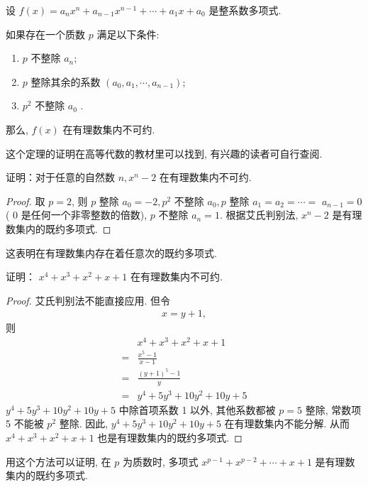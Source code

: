 \begin{theorem}[艾森斯坦判别法]
	设 $f(x)=a_{n} x^{n}+a_{n-1} x^{n-1}+\cdots+a_{1} x+a_{0}$ 是整系数多项式.

	如果存在一个质数 $p$ 满足以下条件:
	\begin{enumerate}
		\item $p$ 不整除 $a_{n}$;
		\item $p$ 整除其余的系数 $\left(a_{0}, a_{1}, \cdots, a_{n-1}\right)$;
		\item $p^{2}$ 不整除 $a_{0}$ .
	\end{enumerate}
	那么, $f(x)$ 在有理数集内不可约.
\end{theorem}

这个定理的证明在高等代数的教材里可以找到, 有兴趣的读者可自行查阅.

\begin{example}
	证明：对于任意的自然数 $n, x^{n}-2$ 在有理数集内不可约.
\end{example}
\begin{proof}
	取 $p=2$, 则 $p$ 整除 $a_{0}=-2, p^{2}$ 不整除 $a_{0}, p$ 整除 $a_{1}=a_{2}=\cdots=$ $a_{n-1}=0$ ( 0 是任何一个非零整数的倍数), $p$ 不整除 $a_{n}=1$. 根据艾氏判别法, $x^{n}-2$ 是有理数集内的既约多项式.
\end{proof}
\begin{note}
	这表明在有理数集内存在着任意次的既约多项式.
\end{note}

\begin{example}
	证明： $x^{4}+x^{3}+x^{2}+x+1$ 在有理数集内不可约.
\end{example}
\begin{proof}
	艾氏判别法不能直接应用. 但令
	\begin{align*}
		x=y+1,
	\end{align*}
	则
	\begin{align*}
		  & x^{4}+x^{3}+x^{2}+x+1         \\
		= & \frac{x^{5}-1}{x-1}           \\
		= & \frac{(y+1)^{5}-1}{y}         \\
		= & y^{4}+5 y^{3}+10 y^{2}+10 y+5
	\end{align*}
	$y^{4}+5 y^{3}+10 y^{2}+10 y+5$ 中除首项系数 1 以外, 其他系数都被 $p=5$ 整除, 常数项 5 不能被 $p^{2}$ 整除. 因此,  $y^{4}+5 y^{3}+10 y^{2}+10 y+5$ 在有理数集内不能分解. 从而 $x^{4}+x^{3}+x^{2}+x+1$ 也是有理数集内的既约多项式.
\end{proof}
\begin{note}
	用这个方法可以证明, 在 $p$ 为质数时, 多项式 $x^{p-1}+x^{p-2}+\cdots+x+1$ 是有理数集内的既约多项式.
\end{note}

